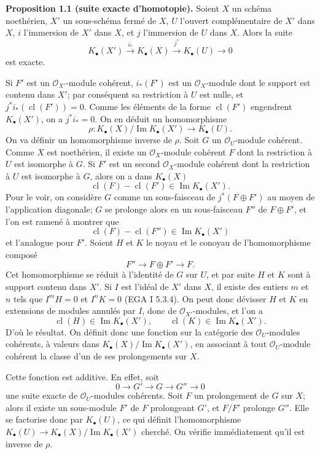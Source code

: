 \documentclass[11pt]{article}
\newcommand{\cl}{\operatorname{cl}}
\begin{document}
\textbf{Proposition 1.1 (suite exacte d'homotopie).} Soient $X$ un schéma noethérien, $X'$ un sous-schéma fermé de $X$, $U$ l'ouvert complémentaire de $X'$ dans $X$, $i$ l'immersion de $X'$ dans $X$, et $j$ l'immersion de $U$ dans $X$. Alors la suite
\[
K_\bullet(X')\xrightarrow{i_*}K_\bullet(X)\xrightarrow{j^*}K_\bullet(U)\longrightarrow 0
\]
est exacte.

Si $F'$ est un $\mathcal O_{X'}$-module cohérent, $i_*(F')$ est un $\mathcal O_X$-module dont le support est contenu dans $X'$; par conséquent sa restriction à $U$ est nulle, et $j^*i_*(\cl(F'))=0$. Comme les éléments de la forme $\cl(F')$ engendrent $K_\bullet(X')$, on a $j^*i_*=0$. On en déduit un homomorphisme
\[
 \rho:K_\bullet(X)/\operatorname{Im}K_\bullet(X')\longrightarrow K_\bullet(U).
\]
On va définir un homomorphisme inverse de $\rho$. Soit $G$ un $\mathcal O_U$-module cohérent. Comme $X$ est noethérien, il existe un $\mathcal O_X$-module cohérent $F$ dont la restriction à $U$ est isomorphe à $G$. Si $F'$ est un second $\mathcal O_X$-module cohérent dont la restriction à $U$ est isomorphe à $G$, alors on a dans $K_\bullet(X)$
\[
 \cl(F)-\cl(F')\in \operatorname{Im}K_\bullet(X').
\]
Pour le voir, on considère $G$ comme un sous-faisceau de $j^*(F\oplus F')$ au moyen de l'application diagonale; $G$ se prolonge alors en un sous-faisceau $F''$ de $F\oplus F'$, et l'on est ramené à montrer que
\[
 \cl(F)-\cl(F'')\in \operatorname{Im}K_\bullet(X')
\]
et l'analogue pour $F'$. Soient $H$ et $K$ le noyau et le conoyau de l'homomorphisme composé
\[
F''\longrightarrow F\oplus F'\longrightarrow F.
\]
Cet homomorphisme se réduit à l'identité de $G$ sur $U$, et par suite $H$ et $K$ sont à support contenu dans $X'$. Si $I$ est l'idéal de $X'$ dans $X$, il existe des entiers $m$ et $n$ tels que $I^mH=0$ et $I^nK=0$ (EGA I 5.3.4). On peut donc dévisser $H$ et $K$ en extensions de modules annulés par $I$, donc de $\mathcal O_{X'}$-modules, et l'on a
\[
\cl(H)\in \operatorname{Im}K_\bullet(X'),\qquad
\cl(K)\in \operatorname{Im}K_\bullet(X').
\]
D'où le résultat. On définit donc une fonction sur la catégorie des $\mathcal O_U$-modules cohérents, à valeurs dans $K_\bullet(X)/\operatorname{Im}K_\bullet(X')$, en associant à tout $\mathcal O_U$-module cohérent la classe d'un de ses prolongements sur $X$.

Cette fonction est additive. En effet, soit
\[
0\longrightarrow G'\longrightarrow G\longrightarrow G''\longrightarrow 0
\]
une suite exacte de $\mathcal O_U$-modules cohérents. Soit $F$ un prolongement de $G$ sur $X$; alors il existe un sous-module $F'$ de $F$ prolongeant $G'$, et $F/F'$ prolonge $G''$. Elle se factorise donc par $K_\bullet(U)$, ce qui définit l'homomorphisme $K_\bullet(U)\to K_\bullet(X)/\operatorname{Im}K_\bullet(X')$ cherché. On vérifie immédiatement qu'il est inverse de $\rho$.
\end{document}
